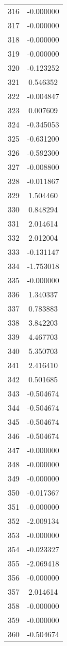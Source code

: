\documentclass[12pt]{article}
\begin{document}
\begin{longtable}{@{}cc@{}}
316 & -0.000000 \\
317 & -0.000000 \\
318 & -0.000000 \\
319 & -0.000000 \\
320 & -0.123252 \\
321 & 0.546352 \\
322 & -0.004847 \\
323 & 0.007609 \\
324 & -0.345053 \\
325 & -0.631200 \\
326 & -0.592300 \\
327 & -0.008800 \\
328 & -0.011867 \\
329 & 1.504460 \\
330 & 0.848294 \\
331 & 2.014614 \\
332 & 2.012004 \\
333 & -0.131147 \\
334 & -1.753018 \\
335 & -0.000000 \\
336 & 1.340337 \\
337 & 0.783883 \\
338 & 3.842203 \\
339 & 4.467703 \\
340 & 5.350703 \\
341 & 2.416410 \\
342 & 0.501685 \\
343 & -0.504674 \\
344 & -0.504674 \\
345 & -0.504674 \\
346 & -0.504674 \\
347 & -0.000000 \\
348 & -0.000000 \\
349 & -0.000000 \\
350 & -0.017367 \\
351 & -0.000000 \\
352 & -2.009134 \\
353 & -0.000000 \\
354 & -0.023327 \\
355 & -2.069418 \\
356 & -0.000000 \\
357 & 2.014614 \\
358 & -0.000000 \\
359 & -0.000000 \\
360 & -0.504674 \\

\end{longtable}
\end{document}
